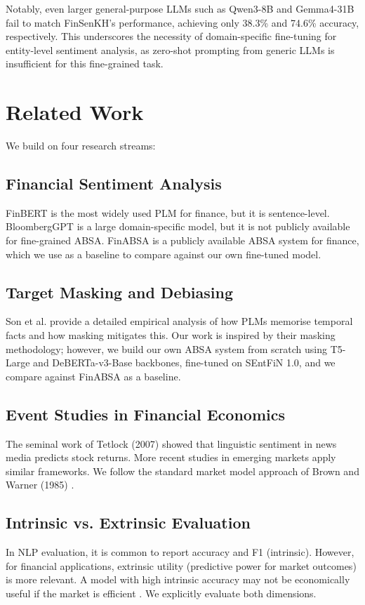 \documentclass[12pt,a4paper]{article}
\begin{document}
Notably, even larger general-purpose LLMs such as Qwen3-8B and Gemma4-31B fail to match FinSenKH's performance, achieving only 38.3\% and 74.6\% accuracy, respectively. This underscores the necessity of domain-specific fine-tuning for entity-level sentiment analysis, as zero-shot prompting from generic LLMs is insufficient for this fine-grained task.

\section{Related Work}
We build on four research streams:

\subsection{Financial Sentiment Analysis}
FinBERT \cite{finbert} is the most widely used PLM for finance, but it is sentence-level. BloombergGPT \cite{bloomberggpt} is a large domain-specific model, but it is not publicly available for fine-grained ABSA. FinABSA \cite{son2023removing} is a publicly available ABSA system for finance, which we use as a baseline to compare against our own fine-tuned model.

\subsection{Target Masking and Debiasing}
Son et al. \cite{nonstationary-knowledge-arxiv} provide a detailed empirical analysis of how PLMs memorise temporal facts and how masking mitigates this. Our work is inspired by their masking methodology; however, we build our own ABSA system from scratch using T5-Large and DeBERTa-v3-Base backbones, fine-tuned on SEntFiN 1.0, and we compare against FinABSA as a baseline.

\subsection{Event Studies in Financial Economics}
The seminal work of Tetlock (2007) \cite{tetlock2007} showed that linguistic sentiment in news media predicts stock returns. More recent studies in emerging markets \cite{vietnam-event-study} apply similar frameworks. We follow the standard market model approach of Brown and Warner (1985) \cite{brownwarner1985}.

\subsection{Intrinsic vs. Extrinsic Evaluation}
In NLP evaluation, it is common to report accuracy and F1 (intrinsic). However, for financial applications, extrinsic utility (predictive power for market outcomes) is more relevant. A model with high intrinsic accuracy may not be economically useful if the market is efficient \cite{fama1970}. We explicitly evaluate both dimensions.
\end{document}
